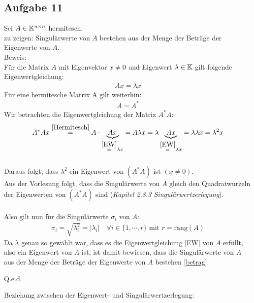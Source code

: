 \subsection*{Aufgabe 11}
Sei $A \in \mathbb K^{n \times n}$ hermitesch.\\
\newline
zu zeigen: Singulärwerte von $A$ bestehen aus der Menge der Beträge der Eigenwerte von $A$.\\
\newline
Beweis:\\
Für die Matrix $A$ mit Eigenvektor $x \neq 0$ und Eigenwert $\lambda \in \mathbb K$ gilt folgende Eigenwertgleichung:
\begin{align}
\label{EW}
Ax=\lambda x
\end{align}
Für eine hermitesche Matrix A gilt weiterhin:\begin{align}\label{Hermitesch}A=A^*\end{align}
Wir betrachten die Eigenwertgleichung der Matrix $A^*A$:
\begin{align*}
A^*Ax\overset{\eqref{Hermitesch}}{=}A\cdot \underbrace{Ax}_{\substack{\overset{\eqref{EW}}{=}\lambda x}}=A\lambda x=\lambda \underbrace{Ax}_{\substack{\overset{\eqref{EW}}{=}\lambda x}}=\lambda \lambda x =\lambda^2x
\end{align*}\\
Daraus folgt, dass $\lambda^2$ ein Eigenwert von $(A^*A)$ ist $(x \neq 0)$.\\
Aus der Vorlesung folgt, dass die Singulärwerte von $A$ gleich den Quadratwurzeln der Eigenwerten von $(A^*A)$ sind (\textit{Kapitel 2.8.3 Singulärwertzerlegung}).\\\\
Also gilt nun für die Singulärwerte $\sigma_i$ von $A$:\\
\begin{align}\label{betrag}\sigma_i= \sqrt{\lambda_i^{2}}=|\lambda_i|\quad \forall i \in\{1,\cdots,r\} \text{ mit } r=\mathrm{rang}(A)\end{align}
\newline
Da $\lambda$ genau so gewählt war, dass es die Eigenwertgleichung \eqref{EW} von $A$ erfüllt, also ein Eigenwert von $A$ ist, ist damit bewiesen, dass die Singulärwerte von $A$ aus der Menge der Beträge der Eigenwerte von $A$ bestehen \eqref{betrag}.
\begin{flushright}Q.e.d.\end{flushright}
Beziehung zwischen der Eigenwert- und Singulärwertzerlegung:\\\\
